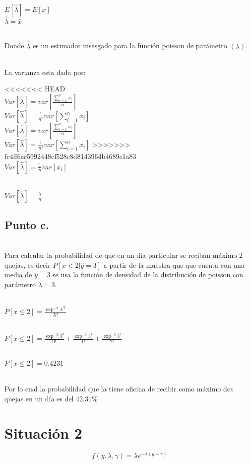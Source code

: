 \documentclass[letterpaper,12pt,onecolumn,titlepage]{article}
\begin{document}
~\\ $E[\hat{\lambda}] = E[x]$
~\\ $\hat{\lambda} = \bar{x}$

~\\ Donde $\hat{\lambda}$ es un estimador insesgado para la funci\'{o}n poisson de par\'{a}metro $(\lambda)$. 

~\\ La varianza esta dada por: 

<<<<<<< HEAD
~\\ $Var[\hat{\lambda}]= var[\frac{\sum\limits_{i=1}^n{x_{i}}}{n}]$
~\\ $Var[\hat{\lambda}]= \frac{1}{n^2} var[\sum\limits_{i=1}^n{x_{i}}]$
=======
~\\ $Var[\hat{\lambda}]= var[\frac{\sum_{i=1}^n{x_{i}}}{n}]$
~\\ $Var[\hat{\lambda}]= \frac{1}{n^2} var[\sum_{i=1}^n{x_{i}}]$
>>>>>>> fc4ff6ec5992448cf528c8d8143964b4689e1a83
~\\ $Var[\hat{\lambda}]= \frac{1}{n} var[x_{i}]$

~\\ $Var[\hat{\lambda}]= \frac{\lambda}{n}$

\subsection{Punto c.}
~\\ Para calcular la probabilidad de que en un d\'{i}a particular se reciban m\'{a}ximo 2 quejas, es decir $P[x<2|\hat{y}=3]$ a partir de la muestra que que cuenta con una media de $\hat{y}=3$ se usa la funci\'{o}n de densidad de la distribuci\'{o}n de poisson con par\'{a}metro $\lambda=3$. 

~\\ $P[x\le2]= \frac{\exp^{-\lambda}\lambda^{X}}{X!}$

~\\ $P[x\le2]= \frac{\exp^{-3}3^{0}}{0!} + 
			 \frac{\exp^{-3}3^{1}}{1!} + 
			 \frac{\exp^{-3}3^{2}}{2!}$
			 
~\\ $P[x\le2]= 0.4231 $

~\\ Por lo cual la probabilidad que la tiene oficina de recibir como m\'{a}ximo dos quejas en un d\'{i}a es del {$42.31\%$}

\pagebreak\section{Situaci\'{o}n 2}
$$f(y,\lambda,\gamma)=\lambda e^{-\lambda(y-\gamma)}$$
\end{document}
